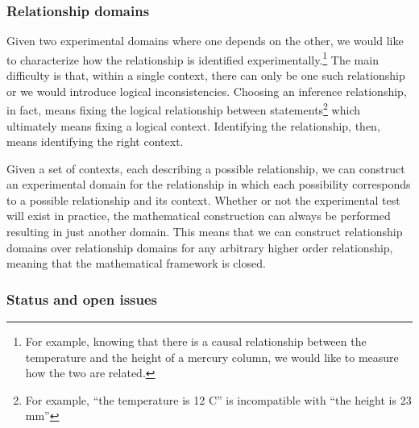 \documentclass[twocolumn]{article}
\newif\ifextended
\newcommand\fact[2]{\ifextended \emph{#1}. #2 \fi}
\begin{document}

\subsubsection{Relationship domains}

Given two experimental domains where one depends on the other, we would like to characterize how the relationship is identified experimentally.\footnote{For example, knowing that there is a causal relationship between the temperature and the height of a mercury column, we would like to measure how the two are related.} The main difficulty is that, within a single context, there can only be one such relationship or we would introduce logical inconsistencies. Choosing an inference relationship, in fact, means fixing the logical relationship between statements\footnote{For example, ``the temperature is 12 C'' is incompatible with ``the height is 23 mm''} which ultimately means fixing a logical context. Identifying the relationship, then, means identifying the right context.

Given a set of contexts, each describing a possible relationship, we can construct an experimental domain for the relationship in which each possibility corresponds to a possible relationship and its context. Whether or not the experimental test will exist in practice, the mathematical construction can always be performed resulting in just another domain. This means that we can construct relationship domains over relationship domains for any arbitrary higher order relationship, meaning that the mathematical framework is closed.

\fact{Tests for the relationship domain} {The experimental verifiability of relationship domain statements cannot be proven from the verifiability of each domain. This formalizes the problem that being able to measure a single point (i.e. the temperature and height in a particular circumstance) is not enough to verify the relationship (i.e. the temperature and height are always linked in a particular way). The ability to experimentally explore the space is what builds confidence, which may not be always possible. What constitutes enough evidence is left, as before, outside of the formalism.}


\subsubsection{Status and open issues}
\end{document}
